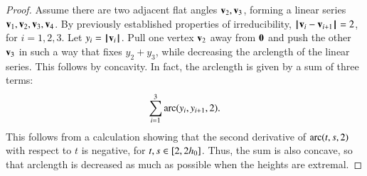 \begin{proof}
Assume there are two adjacent flat angles ${\mathbf v}_2,{\mathbf v}_3$, forming a linear series ${\mathbf v}_1,{\mathbf v}_2,{\mathbf v}_3,{\mathbf v}_4$.
By previously established properties of irreducibility,
%
${\hskip0.1em|\hskip-0.15em|\hskip0.1em}{\mathbf v}_i - {\mathbf v}_{i+1}{\hskip0.1em|\hskip-0.15em|\hskip0.1em}=2$, for $i=1,2,3$.
Let $y_i = {{\hskip0.1em|\hskip-0.15em|\hskip0.1em}{\mathbf v}_i{\hskip0.1em|\hskip-0.15em|\hskip0.1em}}$.
Pull one vertex ${\mathbf v}_2$ away from ${\mathbf 0}$ and push the other ${\mathbf v}_3$ in such a way that fixes $y_2+y_3$, while decreasing the arclength of the linear series.  This follows by concavity.
In fact, the arclength is given by a sum of three terms:
  $$
  \sum_{i=1}^3\operatorname{arc}(y_i,y_{i+1},2).
  $$
This follows from a calculation showing that the second derivative of $\operatorname{arc}(t,s,2)$ with respect to $t$ is negative, for $t,s\in[2,2{h_0}]$.  Thus, the
sum is also concave, so that arclength is decreased as much as possible when the heights are extremal.
\end{proof}


%


